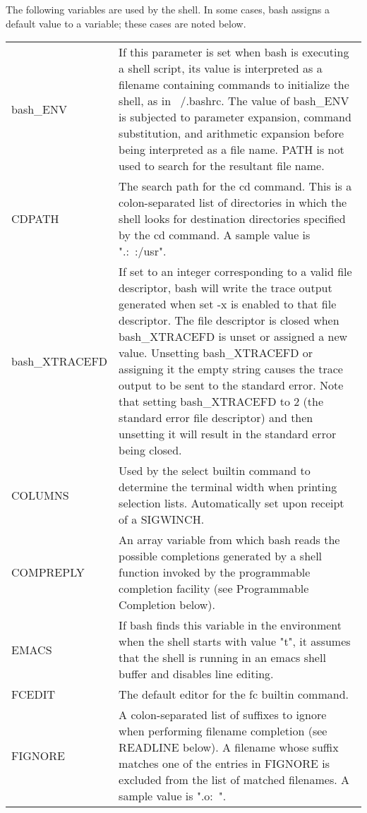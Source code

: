 \documentclass[11pt]{article}
\begin{document}
The following variables are used by the shell. In some cases, bash assigns a default value to a variable; these cases are noted below.
\begin{longtable}{p{}p{}}

bash\_ENV &
If this parameter is set when bash is executing a shell script, its value is interpreted as a filename containing commands to initialize the shell, as in ~/.bashrc. The value of bash\_ENV is subjected to parameter expansion, command substitution, and arithmetic expansion before being interpreted as a file name. PATH is not used to search for the resultant file name. \\

CDPATH &
The search path for the cd command. This is a colon-separated list of directories in which the shell looks for destination directories specified by the cd command. A sample value is ".:~:/usr". \\

bash\_XTRACEFD &
If set to an integer corresponding to a valid file descriptor, bash will write the trace output generated when set -x is enabled to that file descriptor. The file descriptor is closed when bash\_XTRACEFD is unset or assigned a new value. Unsetting bash\_XTRACEFD or assigning it the empty string causes the trace output to be sent to the standard error. Note that setting bash\_XTRACEFD to 2 (the standard error file descriptor) and then unsetting it will result in the standard error being closed. \\

COLUMNS &
Used by the select builtin command to determine the terminal width when printing selection lists. Automatically set upon receipt of a SIGWINCH. \\

COMPREPLY &
An array variable from which bash reads the possible completions generated by a shell function invoked by the programmable completion facility (see Programmable Completion below). \\

EMACS &
If bash finds this variable in the environment when the shell starts with value "t", it assumes that the shell is running in an emacs shell buffer and disables line editing. \\

FCEDIT &

The default editor for the fc builtin command. \\

FIGNORE &
A colon-separated list of suffixes to ignore when performing filename completion (see READLINE below). A filename whose suffix matches one of the entries in FIGNORE is excluded from the list of matched filenames. A sample value is ".o:~". \\


\end{longtable}
\end{document}
